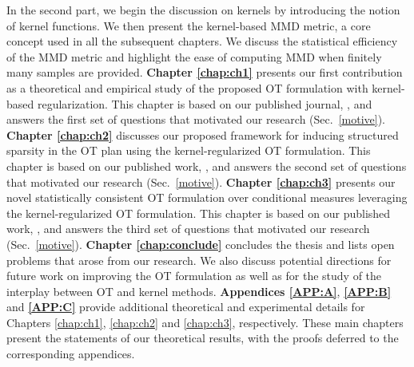 In the second part, we begin the discussion on kernels by introducing the notion of kernel functions. We then present the kernel-based MMD metric, a core concept used in all the subsequent chapters. We discuss the statistical efficiency of the MMD metric and highlight the ease of computing MMD when finitely many samples are provided.
\newline
\newline
\noindent\textbf{Chapter \ref{chap:ch1}} presents our first contribution as a theoretical and empirical study of the proposed OT formulation with kernel-based regularization. This chapter is based on our published journal, \cite{mmd-uot}, and answers the first set of questions that motivated our research (Sec.~\ref{motive}).
\newline
\newline
\noindent\textbf{Chapter \ref{chap:ch2}} discusses our proposed framework for inducing structured sparsity in the OT plan using the kernel-regularized OT formulation. This chapter is based on our published work, \cite{sot}, and answers the second set of questions that motivated our research (Sec.~\ref{motive}).
\newline
\newline
\noindent\textbf{Chapter \ref{chap:ch3}} presents our novel statistically consistent OT formulation over conditional measures leveraging the kernel-regularized OT formulation. This chapter is based on our published work, \cite{cot}, and answers the third set of questions that motivated our research (Sec.~\ref{motive}).
\newline
\newline
\noindent\textbf{Chapter \ref{chap:conclude}} concludes the thesis and lists open problems that arose from our research. We also discuss potential directions for future work on improving the OT formulation as well as for the study of the interplay between OT and kernel methods.
\newline
\newline
\noindent\textbf{Appendices \ref{APP:A}}, \textbf{\ref{APP:B}} and \textbf{\ref{APP:C}} provide additional theoretical and experimental details for Chapters \ref{chap:ch1}, \ref{chap:ch2} and \ref{chap:ch3}, respectively. These main chapters present the statements of our theoretical results, with the proofs deferred to the corresponding appendices.